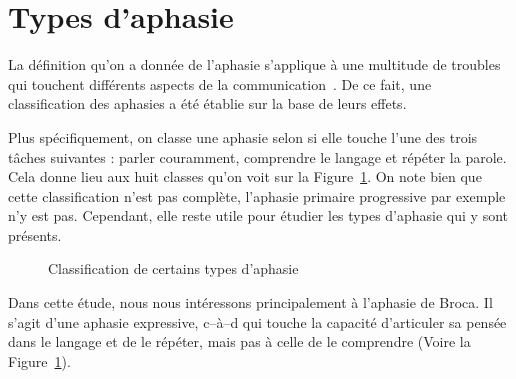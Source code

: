 \section{Types d'aphasie}

La définition qu'on a donnée de l'aphasie s'applique à une multitude de troubles  
qui touchent différents aspects de la communication~\cite[p. 135, 136]{Hallowell_2017}.
De ce fait, une classification des aphasies a été établie sur la base de leurs effets.

Plus spécifiquement, on classe une aphasie selon si elle touche l'une des trois tâches suivantes :
parler couramment, comprendre le langage et répéter la parole. 
Cela donne lieu aux huit classes qu'on voit sur la Figure~\ref{fig:aphasia-tree}.
On note  bien que cette classification n'est pas complète, l'aphasie primaire progressive par exemple n'y est pas.
Cependant, elle reste utile pour étudier les types d'aphasie qui y sont présents.


\begin{figure}[htb]
    \begin{center}
        \resizebox{\textwidth}{!}{}
    \end{center}
    \caption[Classification de certains types d'aphasie]
    {Classification de certains types d'aphasie~\cite{Sreedharan_2018}}
    \label{fig:aphasia-tree}
\end{figure}

Dans cette étude, nous nous intéressons principalement à l'aphasie de Broca.
Il s'agit d'une aphasie expressive, 
c--à--d qui touche la capacité d'articuler sa pensée dans le langage et de le répéter, 
mais pas à celle de le comprendre (Voire la Figure~\ref{fig:aphasia-tree}).
